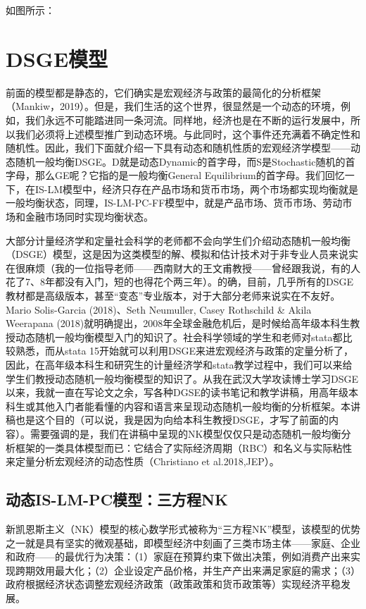 \documentclass[cn,12pt,math=newtx,citestyle=gb7714-2015,bibstyle=gb7714-2015]{elegantbook}
\begin{document}
如图所示：

	
	
	\section{DSGE模型}
	
	前面的模型都是静态的，它们确实是宏观经济与政策的最简化的分析框架（Mankiw，2019）。但是，我们生活的这个世界，很显然是一个动态的环境，例如，我们永远不可能踏进同一条河流。同样地，经济也是在不断的运行发展中，所以我们必须将上述模型推广到动态环境。与此同时，这个事件还充满着不确定性和随机性。因此，我们下面就介绍一下具有动态和随机性质的宏观经济学模型——动态随机一般均衡DSGE。D就是动态Dynamic的首字母，而S是Stochastic随机的首字母，那么GE呢？它指的是一般均衡General Equilibrium的首字母。我们回忆一下，在IS-LM模型中，经济只存在产品市场和货币市场，两个市场都实现均衡就是一般均衡状态，同理，IS-LM-PC-FF模型中，就是产品市场、货币市场、劳动市场和金融市场同时实现均衡状态。
	
	大部分计量经济学和定量社会科学的老师都不会向学生们介绍动态随机一般均衡（DSGE）模型，这是因为这类模型的解、模拟和估计技术对于非专业人员来说实在很麻烦（我的一位指导老师——西南财大的王文甫教授——曾经跟我说，有的人花了7、8年都没有入门，短的也得花个两三年）。的确，目前，几乎所有的DSGE教材都是高级版本，甚至“变态”专业版本，对于大部分老师来说实在不友好。Mario Solis-Garcia (2018)、Seth Neumuller, Casey Rothschild \& Akila Weerapana (2018)就明确提出，2008年全球金融危机后，是时候给高年级本科生教授动态随机一般均衡模型入门的知识了。社会科学领域的学生和老师对stata都比较熟悉，而从stata 15开始就可以利用DSGE来进宏观经济与政策的定量分析了，因此，在高年级本科生和研究生的计量经济学和stata教学过程中，我们可以来给学生们教授动态随机一般均衡模型的知识了。从我在武汉大学攻读博士学习DSGE以来，我就一直在写论文之余，写各种DGSE的读书笔记和教学讲稿，用高年级本科生或其他入门者能看懂的内容和语言来呈现动态随机一般均衡的分析框架。本讲稿也是这个目的（可以说，我是因为向给本科生教授DSGE，才写了前面的内容）。需要强调的是，我们在讲稿中呈现的NK模型仅仅只是动态随机一般均衡分析框架的一类具体模型而已：它结合了实际经济周期（RBC）和名义与实际粘性来定量分析宏观经济的动态性质（Christiano et al.2018,JEP）。
	
	\subsection{动态IS-LM-PC模型：三方程NK}
	
	新凯恩斯主义（NK）模型的核心数学形式被称为“三方程NK”模型，该模型的优势之一就是具有坚实的微观基础，即模型经济中刻画了三类市场主体——家庭、企业和政府——的最优行为决策：（1）家庭在预算约束下做出决策，例如消费产出来实现跨期效用最大化；（2）企业设定产品价格，并生产产出来满足家庭的需求；（3）政府根据经济状态调整宏观经济政策（政策政策和货币政策等）实现经济平稳发展。
	
\end{document}
